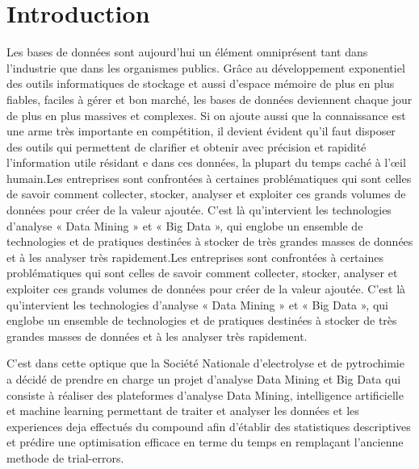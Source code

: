 \documentclass[11pt]{report}
\begin{document}
\newpage
\sf
\chapter*{Introduction}
Les bases de données sont aujourd’hui un élément omniprésent tant dans l’industrie que dans les
organismes publics. Grâce au développement exponentiel des outils informatiques de stockage et
aussi d’espace mémoire de plus en plus fiables, faciles à gérer et bon marché, les bases de données
deviennent chaque jour de plus en plus massives et complexes. Si on ajoute aussi que la
connaissance est une arme très importante en compétition, il devient évident qu’il faut disposer des
outils qui permettent de clarifier et obtenir avec précision et rapidité l’information utile résidant e
dans ces données, la plupart du temps caché à l’œil humain.Les entreprises sont confrontées à certaines problématiques qui sont celles de savoir comment
collecter, stocker, analyser et exploiter ces grands volumes de données pour créer de la valeur
ajoutée. C'est là qu'intervient les technologies d’analyse « Data Mining » et « Big Data », qui
englobe un ensemble de technologies et de pratiques destinées à stocker de très grandes masses de
données et à les analyser très rapidement.Les entreprises sont confrontées à certaines problématiques qui sont celles de savoir comment
collecter, stocker, analyser et exploiter ces grands volumes de données pour créer de la valeur
ajoutée. C'est là qu'intervient les technologies d’analyse « Data Mining » et « Big Data », qui
englobe un ensemble de technologies et de pratiques destinées à stocker de très grandes masses de
données et à les analyser très rapidement.

C'est dans cette optique que la Société Nationale d'electrolyse et de pytrochimie a décidé
de prendre en charge un projet d’analyse Data Mining et Big Data qui consiste à réaliser des
plateformes d’analyse Data Mining, intelligence artificielle et machine learning permettant de traiter et analyser les données et les experiences deja effectués du compound afin d’établir des statistiques descriptives et prédire une optimisation efficace en terme du temps en remplaçant l'ancienne methode de trial-errors.
%
%
\end{document}
